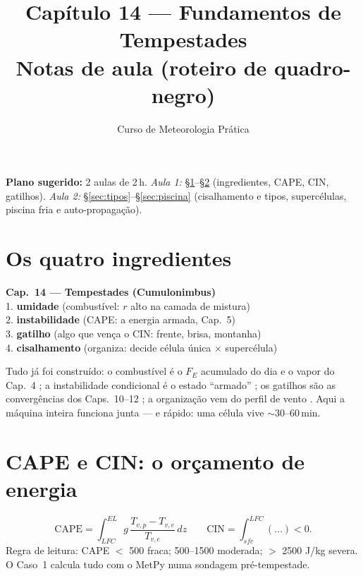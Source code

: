 \documentclass[11pt]{article}
\title{Capítulo 14 --- Fundamentos de Tempestades\\
{\large Notas de aula (roteiro de quadro-negro)}}
\author{Curso de Meteorologia Prática}
\date{}
\begin{document}
\maketitle
\thispagestyle{fancy}

\noindent\textbf{Plano sugerido:} 2 aulas de 2\,h.
\emph{Aula 1:} \S\ref{sec:ingred}--\S\ref{sec:cape} (ingredientes, CAPE,
CIN, gatilhos).
\emph{Aula 2:} \S\ref{sec:tipos}--\S\ref{sec:piscina} (cisalhamento e
tipos, supercélulas, piscina fria e auto-propagação).

\section{Os quatro ingredientes}\label{sec:ingred}

\begin{noquadro}
\textbf{Cap.~14 --- Tempestades (Cumulonimbus)}\\[2pt]
1. \textbf{umidade} (combustível: $r$ alto na camada de mistura)\\
2. \textbf{instabilidade} (CAPE: a energia armada, Cap.~5)\\
3. \textbf{gatilho} (algo que vença o CIN: frente, brisa, montanha)\\
4. \textbf{cisalhamento} (organiza: decide célula única × supercélula)
\end{noquadro}

Tudo já foi construído: o combustível é o $F_E$ acumulado do dia
 e o vapor do Cap.~4 ; a instabilidade condicional é o estado ``armado''
; os gatilhos são as convergências
dos Caps.~10--12 ; a organização vem
do perfil de vento . Aqui a máquina
inteira funciona junta — e rápido: uma célula vive $\sim$30--60\,min.

\section{CAPE e CIN: o orçamento de energia}\label{sec:cape}


\begin{formalivro}
\[ \mathrm{CAPE} = \int_{LFC}^{EL} g\,
\frac{T_{v,p} - T_{v,e}}{T_{v,e}}\,dz
\qquad
\mathrm{CIN} = \int_{sfc}^{LFC}(\ldots) < 0. \]
Regra de leitura: CAPE $<$ 500 fraca; 500--1500 moderada; $>$ 2500
J/kg severa. O Caso~1 calcula tudo com o MetPy numa sondagem
pré-tempestade.
\end{formalivro}
\end{document}
